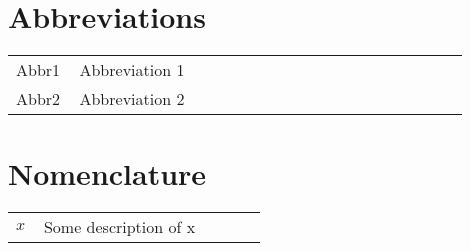 \section*{Abbreviations}
\begin{table}[H]
	\label{tab:abbreviations}
	\begin{tabular}{p{0.1\linewidth}p{0.8\linewidth}}
		Abbr1 & Abbreviation 1\\
		Abbr2 & Abbreviation 2\\
	\end{tabular} 
\end{table}

\section*{Nomenclature}
\begin{table}[H]
	\label{tab:nomenclature}
 	\begin{tabular}{p{0.1\linewidth}p{0.8\linewidth}}
		$x$ & Some description of x\\
 	\end{tabular} 
\end{table}
\makenomenclature
